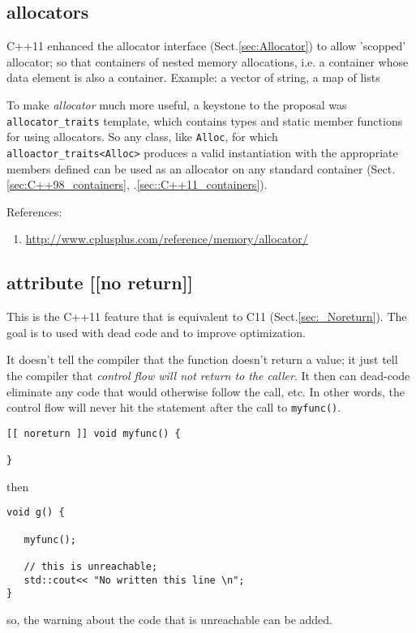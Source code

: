 \subsection{allocators}
\label{sec:C++11_allocators}

C++11 enhanced the allocator interface (Sect.\ref{sec:Allocator}) to allow
'scopped' allocator; so that containers of nested memory allocations, i.e. a
container whose data element is also a container. Example: a vector of string, a
map of lists

To make {\it allocator} much more useful, a keystone to the proposal was
\verb!allocator_traits! template, which contains types and static member
functions for using allocators. So any class, like \verb!Alloc!, for which
\verb!alloactor_traits<Alloc>! produces a valid instantiation with the
appropriate members defined can be used as an allocator on any standard
container (Sect.\ref{sec:C++98_containers}, .\ref{sec::C++11_containers}).




References:
\begin{enumerate}
  \item \url{http://www.cplusplus.com/reference/memory/allocator/}
\end{enumerate}

\subsection{attribute [[no return]]}
\label{sec:[[noreturn]]}

This is the C++11 feature that is equivalent to C11 (Sect.\ref{sec:_Noreturn}).
The goal is to used with dead code and to improve optimization. 



It doesn't tell the compiler that the function doesn't return a value; it just
tell the compiler that {\it control flow will not return to the caller}. It then
can dead-code eliminate any code that would otherwise follow the call, etc. In
other words, the control flow will never hit the statement after the call to
\verb!myfunc()!.

\begin{verbatim}
[[ noreturn ]] void myfunc() {

}
\end{verbatim}
then 
\begin{verbatim}
void g() {

   myfunc(); 
   
   // this is unreachable;
   std::cout<< "No written this line \n";
}
\end{verbatim}
so, the warning about the code that is unreachable can be added.


